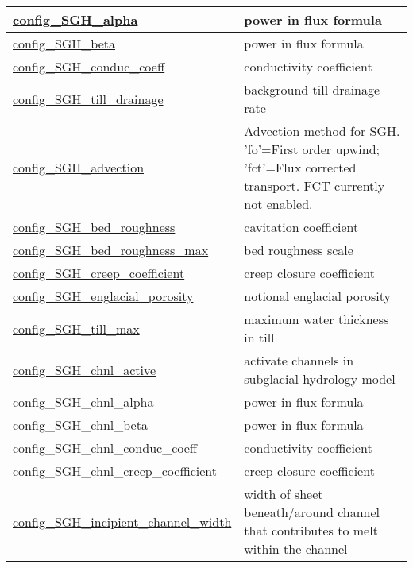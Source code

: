 {\begin{center}
\begin{longtable}{| p{2.0in} || p{4.0in} |}
    \hline
    \hyperref[subsec:nm_sec_config_SGH_alpha]{config\_SGH\_alpha} & power in flux formula \\
    \hline
    \hyperref[subsec:nm_sec_config_SGH_beta]{config\_SGH\_beta} & power in flux formula \\
    \hline
    \hyperref[subsec:nm_sec_config_SGH_conduc_coeff]{config\_SGH\_conduc\_coeff} & conductivity coefficient \\
    \hline
    \hyperref[subsec:nm_sec_config_SGH_till_drainage]{config\_SGH\_till\_drainage} & background till drainage rate \\
    \hline
    \hyperref[subsec:nm_sec_config_SGH_advection]{config\_SGH\_advection} & Advection method for SGH.  'fo'=First order upwind; 'fct'=Flux corrected transport.  FCT currently not enabled. \\
    \hline
    \hyperref[subsec:nm_sec_config_SGH_bed_roughness]{config\_SGH\_bed\_roughness} & cavitation coefficient \\
    \hline
    \hyperref[subsec:nm_sec_config_SGH_bed_roughness_max]{config\_SGH\_bed\_roughness\_\-max} & bed roughness scale \\
    \hline
    \hyperref[subsec:nm_sec_config_SGH_creep_coefficient]{config\_SGH\_creep\_coefficient} & creep closure coefficient \\
    \hline
    \hyperref[subsec:nm_sec_config_SGH_englacial_porosity]{config\_SGH\_englacial\_porosity} & notional englacial porosity \\
    \hline
    \hyperref[subsec:nm_sec_config_SGH_till_max]{config\_SGH\_till\_max} & maximum water thickness in till \\
    \hline
    \hyperref[subsec:nm_sec_config_SGH_chnl_active]{config\_SGH\_chnl\_active} & activate channels in subglacial hydrology model \\
    \hline
    \hyperref[subsec:nm_sec_config_SGH_chnl_alpha]{config\_SGH\_chnl\_alpha} & power in flux formula \\
    \hline
    \hyperref[subsec:nm_sec_config_SGH_chnl_beta]{config\_SGH\_chnl\_beta} & power in flux formula \\
    \hline
    \hyperref[subsec:nm_sec_config_SGH_chnl_conduc_coeff]{config\_SGH\_chnl\_conduc\_coeff} & conductivity coefficient \\
    \hline
    \hyperref[subsec:nm_sec_config_SGH_chnl_creep_coefficient]{config\_SGH\_chnl\_creep\_\-coefficient} & creep closure coefficient \\
    \hline
    \hyperref[subsec:nm_sec_config_SGH_incipient_channel_width]{config\_SGH\_incipient\_\-channel\_width} & width of sheet beneath/around channel that contributes to melt within the channel \\

\end{longtable}
\end{center}}
